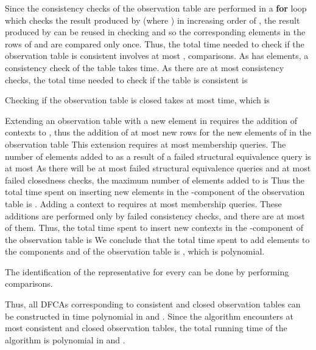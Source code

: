 \documentclass[preprint,12pt,english]{article}
\begin{document}
Since the consistency checks of the observation table are performed in  a {\bf for} loop which checks the result produced by  (where ) in increasing order of , the result produced by  can be reused in checking  and so the corresponding elements in the rows of  and  are compared only once. Thus, the total time needed to check if the observation table is consistent involves at most , comparisons.
As  has   elements, a consistency check of the  table takes  time.
As there are at most  consistency checks, the total time needed to check if the  table is consistent is 

Checking if the observation table is closed takes at most  time, which is 


Extending an observation table  with a new element in  requires the addition of  contexts to , thus the addition of at most  new rows for the new elements of  in the observation table  This extension requires 
at most
 membership queries. The number of elements added to  as a result of a failed structural equivalence query is at most  As there will be at most  failed structural equivalence queries and at most  failed closedness checks, the maximum number of elements added to  is  Thus the total time spent on inserting new elements in the -component of the observation table is . 
 Adding a context to  requires at most  membership  queries. These additions are performed only by failed consistency checks, and there are at most  of them. Thus, the total time spent to insert new contexts in the -component of the observation table is 
We conclude that the total time spent to add elements to the components  and  of the observation table is , which is polynomial.
 
The identification of the representative  for every  can be done by performing  comparisons.

Thus, all DFCAs  corresponding to consistent and closed observation tables  can be constructed in time  polynomial in  and . Since the algorithm encounters at most  consistent and closed observation tables, the total running time of the algorithm is polynomial in  and .
\end{document}
